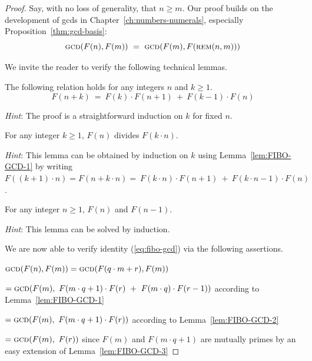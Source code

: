 \begin{proof}
Say, with no loss of generality,  that $n \geq m$.   Our proof builds on the development of {\sc gcd}s in Chapter~\ref{ch:numbers-numerals}, especially Proposition~\ref{thm:gcd-basis}:
\[ \mbox{\sc gcd}(F(n),F(m)) \ = \ \mbox{\sc gcd}(F(m), F(\mbox{\sc rem}(n,m))) \]

\medskip

\noindent
We invite the reader to verify the following technical lemmas.


\begin{lemma}
\label{lem:FIBO-GCD-1}
The following relation holds for any integers $n$ and $k \geq 1$.
\[  F(n+k) \ = \ F(k) \cdot F(n+1) \ + \ F(k-1) \cdot F(n) \] 
\end{lemma}

\noindent
{\em Hint}: The proof is a straightforward induction on $k$ for fixed $n$.

\begin{lemma}
\label{lem:FIBO-GCD-2}
For any integer $k \geq 1$, $F(n)$ divides $F(k \cdot n)$.
\end{lemma}

\noindent
{\em Hint}: This lemma can be obtained by induction on $k$ using Lemma~\ref{lem:FIBO-GCD-1}
by writing $F((k+1) \cdot n) = F(n + k \cdot n) = \ F(k \cdot n) \cdot F(n+1) \ + \ F(k \cdot n - 1) \cdot F(n)$.

\begin{lemma}
\label{lem:FIBO-GCD-3}
For any integer $n \geq 1$, $F(n)$ and $F(n-1)$.
\end{lemma}

\noindent
{\em Hint}: This lemma can be solved by induction. 

\bigskip

\noindent
We are now able to verify identity (\ref{eq:fibo-gcd}) via the following assertions.

\medskip

$\mbox{\sc gcd}(F(n),F(m)) = \mbox{\sc gcd}(F(q \cdot m + r),F(m) )$

$ = \mbox{\sc gcd}(F(m), \ F(m \cdot q +1) \cdot F(r) \ + \ F(m \cdot q) \cdot F(r-1))$ according to Lemma~\ref{lem:FIBO-GCD-1}

$ = \mbox{\sc gcd}(F(m), \ F(m \cdot q +1) \cdot F(r) )$ according to Lemma~\ref{lem:FIBO-GCD-2}

$ = \mbox{\sc gcd}(F(m), \ F(r) )$ since $ F(m)$ and $F(m \cdot q +1)$ are mutually primes by an easy extension of Lemma~\ref{lem:FIBO-GCD-3} 


\end{proof}
